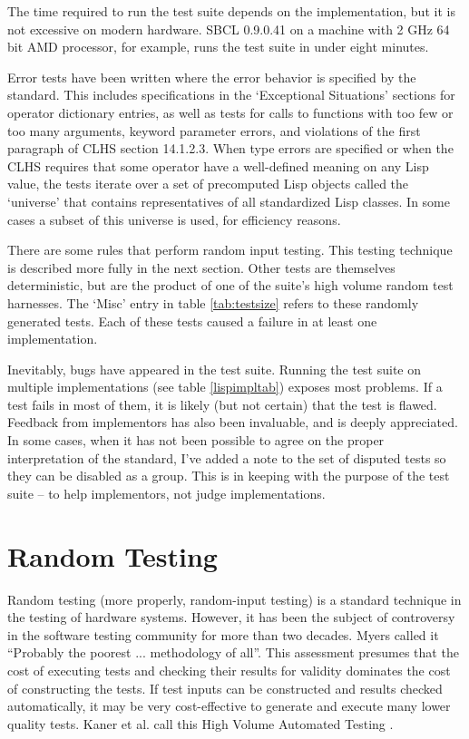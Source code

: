 \documentclass[11pt]{article}
\begin{document}
The time required to run the test suite depends on the implementation,
but it is not excessive on modern hardware.  SBCL 0.9.0.41 on a
machine with 2 GHz 64 bit AMD processor, for example, runs the test
suite in under eight minutes.

Error tests have been written where the error behavior is specified by
the standard.  This includes specifications in the `Exceptional
Situations' sections for operator dictionary entries, as well as tests
for calls to functions with too few or too many arguments, keyword
parameter errors, and violations of the first paragraph of CLHS
section 14.1.2.3.  When type errors are specified or when the CLHS
requires that some operator have a well-defined meaning on any Lisp
value, the tests iterate over a set of precomputed Lisp objects
called the `universe' that contains representatives of all
standardized Lisp classes.  In some cases a subset of this universe is
used, for efficiency reasons.

There are some rules that perform random input testing.  This testing
technique is described more fully in the next section.  Other tests
are themselves deterministic, but are the product of one of the
suite's high volume random test harnesses.  The `Misc' entry in table
\ref{tab:testsize} refers to these randomly generated tests.  Each of
these tests caused a failure in at least one implementation.

Inevitably, bugs have appeared in the test suite.  Running the test
suite on multiple implementations (see table \ref{lispimpltab})
exposes most problems.  If a test fails in most of them, it is likely
(but not certain) that the test is flawed.  Feedback from implementors
has also been invaluable, and is deeply appreciated.  In some cases,
when it has not been possible to agree on the proper interpretation
of the standard, I've added a note to the set of disputed tests so
they can be disabled as a group.  This is in keeping with the purpose
of the test suite -- to help implementors, not judge implementations.


\section {Random Testing}

Random testing (more properly, random-input testing) is a standard
technique in the testing of hardware systems.  However, it has been the
subject of controversy in the software testing community for more than
two decades.  Myers \cite{Myers:79} called it ``Probably the poorest
... methodology of all''.  This assessment presumes that the cost of
executing tests and checking their results for validity dominates the
cost of constructing the tests.  If test inputs can be constructed and
results checked automatically, it may be very cost-effective to
generate and execute many lower quality tests.  Kaner et
al. call this High Volume Automated Testing \cite{KanerBondMcGee:04}.
\end{document}
